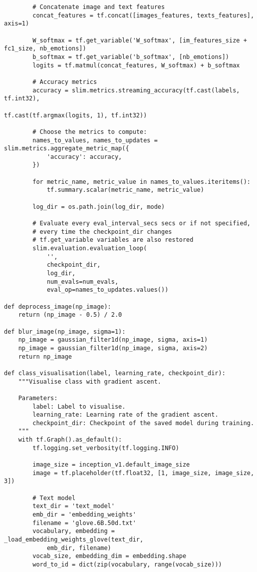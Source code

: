 \begin{lstlisting}
        # Concatenate image and text features
        concat_features = tf.concat([images_features, texts_features], axis=1)

        W_softmax = tf.get_variable('W_softmax', [im_features_size + fc1_size, nb_emotions])
        b_softmax = tf.get_variable('b_softmax', [nb_emotions])
        logits = tf.matmul(concat_features, W_softmax) + b_softmax

        # Accuracy metrics
        accuracy = slim.metrics.streaming_accuracy(tf.cast(labels, tf.int32),
                                                   tf.cast(tf.argmax(logits, 1), tf.int32))

        # Choose the metrics to compute:
        names_to_values, names_to_updates = slim.metrics.aggregate_metric_map({
            'accuracy': accuracy,
        })

        for metric_name, metric_value in names_to_values.iteritems():
            tf.summary.scalar(metric_name, metric_value)

        log_dir = os.path.join(log_dir, mode)

        # Evaluate every eval_interval_secs secs or if not specified,
        # every time the checkpoint_dir changes
        # tf.get_variable variables are also restored
        slim.evaluation.evaluation_loop(
            '',
            checkpoint_dir,
            log_dir,
            num_evals=num_evals,
            eval_op=names_to_updates.values())
            
def deprocess_image(np_image):
    return (np_image - 0.5) / 2.0

def blur_image(np_image, sigma=1):
    np_image = gaussian_filter1d(np_image, sigma, axis=1)
    np_image = gaussian_filter1d(np_image, sigma, axis=2)
    return np_image

def class_visualisation(label, learning_rate, checkpoint_dir):
    """Visualise class with gradient ascent.
    
    Parameters:
        label: Label to visualise.
        learning_rate: Learning rate of the gradient ascent.
        checkpoint_dir: Checkpoint of the saved model during training.
    """
    with tf.Graph().as_default():
        tf.logging.set_verbosity(tf.logging.INFO)

        image_size = inception_v1.default_image_size
        image = tf.placeholder(tf.float32, [1, image_size, image_size, 3])

        # Text model
        text_dir = 'text_model'
        emb_dir = 'embedding_weights'
        filename = 'glove.6B.50d.txt'
        vocabulary, embedding = _load_embedding_weights_glove(text_dir, 
            emb_dir, filename)
        vocab_size, embedding_dim = embedding.shape
        word_to_id = dict(zip(vocabulary, range(vocab_size)))


\end{lstlisting}

